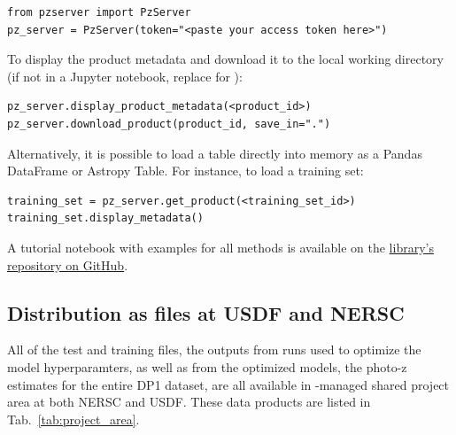 \begin{verbatim}
from pzserver import PzServer
pz_server = PzServer(token="<paste your access token here>")  
\end{verbatim}

To display the product metadata and download it to the local working directory (if not in a Jupyter notebook, replace  for ):   
\begin{verbatim}
pz_server.display_product_metadata(<product_id>)
pz_server.download_product(product_id, save_in=".")
\end{verbatim}

Alternatively, it is possible to load a table directly into memory as a Pandas DataFrame or Astropy Table. For instance, to load a training set:  

\begin{verbatim}
training_set = pz_server.get_product(<training_set_id>)
training_set.display_metadata()
\end{verbatim}


A tutorial notebook with examples for all  methods is available on the \href{https://github.com/linea-it/pzserver/blob/main/docs/notebooks/pzserver_tutorial.ipynb}{ library's repository on GitHub}.


\subsection{Distribution as files at USDF and NERSC}
\label{sec:distribution:files}

All of the test and training files, the outputs from runs used to optimize the model hyperparamters, as well as from the optimized models, the photo-z estimates for the entire DP1 dataset, are all available in -managed shared project area at both NERSC and USDF.  These data products are listed in Tab.~\ref{tab:project_area}.

